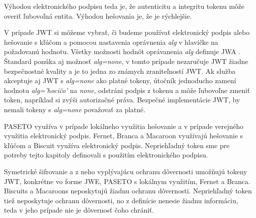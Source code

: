 Výhodou elektronického podpisu teda je, že autenticitu a integritu tokenu môže overiť ľubovoľná entita. Výhodou hešovania je, že je rýchlejšie. 

V prípade JWT si môžeme vybrať, či budeme používať elektronický podpis alebo hešovanie s kľúčom a pomocou nastavenia oprávnenia \textit{alg} v hlavičke na požadovanú hodnotu. Všetky možnosti hodnôt oprávanenia \textit{alg} definuje  JWA \cite{jwa_rfc}. Štandard ponúka aj možnosť \textit{alg=none}, v tomto prípade nezaručuje JWT žiadne bezpečnostné kvality a je to jedna zo známych zraniteľností \cite{jwt_vul} JWT. Ak služba akceptuje aj JWT s \textit{alg=none} ako platné tokeny, útočník jednoducho zamení hodnotu \textit{alg='hocičo'} na \textit{none}, odstráni podpis z tokenu a môže ľubovoľne zmeniť token, napríklad si zvýši autorizačné práva. Bezpečné implementácie JWT, by nemali tokeny s \textit{alg=none} považovať za platné.

PASETO využíva v prípade lokálneho využitia hešovanie a v prípade verejného využitia elektronický podpis. Fernet, Branca a Macaroon využívajú hešovanie s kľúčom a Biscuit využíva elektronický podpis. Nepriehľadný token sme pre potreby tejto kapitoly definovali s použitím elektronického podpisu.

Symetrické šifrovanie a z neho vyplývajúcu ochranu dôvernosti umožňujú tokeny JWT, konkrétne vo forme JWE, PASETO s lokálnym využitím, Fernet a Branca. Biscuits a Macaroons neposkytujú žiadnu ochranu dôvernosti. Nepriehľadný token tiež neposkytuje ochranu dôvernosti, no z definície nenesie žiadnu informáciu, teda v jeho prípade nie je dôvernosť čoho chrániť.